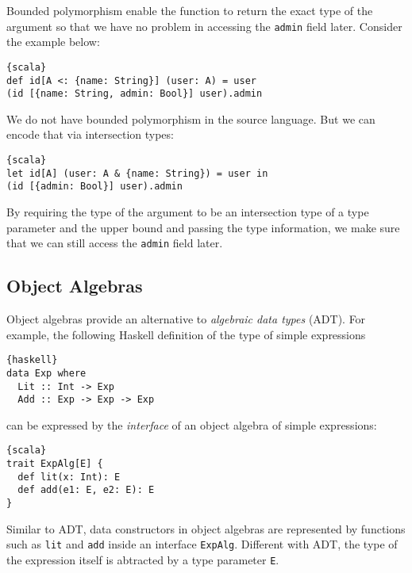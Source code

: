 Bounded polymorphism enable the function to return the exact type of the
argument so that we have no problem in accessing the \texttt{admin} field later.
Consider the example below:
\begin{lstlisting}{scala}
def id[A <: {name: String}] (user: A) = user
(id [{name: String, admin: Bool}] user).admin
\end{lstlisting}

We do not have bounded polymorphism in the source language. But we can encode
that via intersection types:
\begin{lstlisting}{scala}
let id[A] (user: A & {name: String}) = user in
(id [{admin: Bool}] user).admin
\end{lstlisting}
By requiring the type of the argument to be an intersection type of a type
parameter and the upper bound and passing the type information, we make sure
that we can still access the \lstinline{admin} field later.






\subsection{Object Algebras}

Object algebras provide an alternative to \emph{algebraic data types}
(ADT).
 For example, the
following Haskell definition of the type of simple expressions
\begin{lstlisting}{haskell}
data Exp where
  Lit :: Int -> Exp
  Add :: Exp -> Exp -> Exp
\end{lstlisting}
can be expressed by the \emph{interface} of an object algebra of
simple expressions:
\begin{lstlisting}{scala}
trait ExpAlg[E] {
  def lit(x: Int): E
  def add(e1: E, e2: E): E
}
\end{lstlisting}
Similar to ADT, data constructors in object algebras are represented by functions such as
\lstinline{lit} and \lstinline{add} inside an interface \lstinline{ExpAlg}.
Different with ADT, the type of the expression itself is abtracted by a type
parameter \lstinline{E}.

